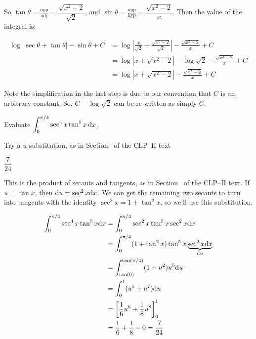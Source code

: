 \begin{solution}
\begin{center}
\end{center}

So $\tan \theta = \frac{\mbox{opp}}{\mbox{adj}}=\dfrac{\sqrt{x^2-2}}{\sqrt{2}}$, and $\sin\theta = \frac{\mbox{opp}}{\mbox{hyp}}=\dfrac{\sqrt{x^2-2}}{x}$. Then the value of the integral is:

\begin{align*}
\log|\sec\theta + \tan\theta|-\sin\theta +C
&={ \log \left|
\frac{x}{\sqrt{2}}+\frac{\sqrt{x^2-2}}{\sqrt{2}}
\right|-\frac{\sqrt{x^2-2}}{x}+C}\\
&={ \log \left| x+{\sqrt{x^2-2}}
\right|-\log\sqrt{2}-\frac{\sqrt{x^2-2}}{x}+C}\\
&= \log \left| x+{\sqrt{x^2-2}}
\right|-\frac{\sqrt{x^2-2}}{x}+C
\end{align*}

Note the simplification in the last step is due to our convention that $C$ is an arbitrary constant. So, $C-\log\sqrt{2}$ can be re-written as simply $C$.
\end{solution}




\begin{question} Evaluate
$\displaystyle\int_0^{\pi/4} \sec^4x\tan^5x\,\mathrm{d}x$.
\end{question}

\begin{hint}
Try a $u$-substitution, as in Section~ of the CLP--II text%
\end{hint}

\begin{answer}
$\dfrac{7}{24}$
\end{answer}

\begin{solution}

This is the product of secants and tangents, as in Section~
of the CLP--II text. %
 If $u=\tan x$, then $\mathrm{d}u=\sec^2x\mathrm{d}x$. We can get the remaining two secants to turn into tangents with the identity $\sec^2x=1+\tan^2x$, so we'll use this substitution.

\begin{align*}
\int_{0}^{\pi/4} \sec^4x\tan^5x\mathrm{d}x&=
\int_{0}^{\pi/4} \sec^2x\tan^5x\sec^2x\mathrm{d}x\\
&=
\int_{0}^{\pi/4} (1+\tan^2x)\tan^5x\underbrace{\sec^2x\mathrm{d}x}_{\mathrm{d}u}
\\
&=
\int_{\tan(0)}^{\tan(\pi/4)} (1+u^2)u^5\mathrm{d}u
\\
&=
\int_{0}^{1} (u^5+u^7)\mathrm{d}u
\\
&=
\left[\frac{1}{6}u^6+\frac{1}{8}u^8\right]_{0}^{1}
\\
&=\frac{1}{6}+\frac{1}{8}-0=\frac{7}{24}
\end{align*}
\end{solution}







